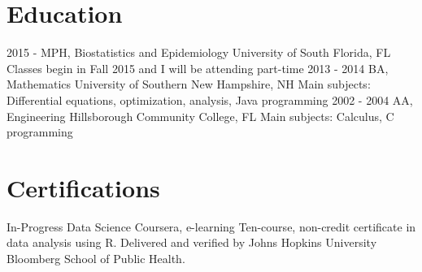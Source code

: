 \documentclass[]{friggeri-cv}
\begin{document}
\section{Education}
\begin{entrylist}
  \entry
    {2015 - }
    {MPH, Biostatistics and Epidemiology}
    {University of South Florida, FL}
    {Classes begin in Fall 2015 and I will be attending part-time}
  \entry
    {2013 - 2014}
    {BA, Mathematics}
    {University of Southern New Hampshire, NH}
    {Main subjects: Differential equations, optimization, analysis, Java programming}
  \entry
    {2002 - 2004}
    {AA, Engineering}
    {Hillsborough Community College, FL}
    {Main subjects: Calculus, C programming}
\end{entrylist}

\section{Certifications}
\begin{entrylist}
  \entry
    {In-Progress}
    {Data Science}
    {Coursera, e-learning}
    {Ten-course, non-credit certificate in data analysis using R.  Delivered and verified by Johns Hopkins University Bloomberg School of Public Health.}
\end{entrylist}
\end{document}
